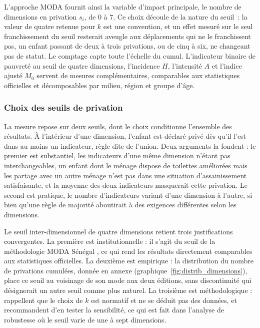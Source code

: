 L'approche MODA fournit ainsi la variable d'impact principale, le nombre
de dimensions en privation $s_i$, de 0 à 7. Ce choix découle de la nature
du seuil~: la valeur de quatre retenue pour $k$ est une convention, et un effet mesuré sur le seul
franchissement du seuil resterait aveugle aux déplacements qui ne le
franchissent pas, un enfant passant de deux à trois privations, ou de cinq
à six, ne changeant pas de statut. Le comptage capte toute l'échelle du
cumul. L'indicateur binaire de pauvreté au seuil de quatre dimensions, l'incidence $H$,
l'intensité $A$ et l'indice ajusté $M_0$ servent de mesures
complémentaires, comparables aux statistiques officielles et décomposables
par milieu, région et groupe d'âge.

\subsubsection{Choix des seuils de privation}

La mesure repose sur deux seuils, dont le choix conditionne l'ensemble des
résultats. À l'intérieur d'une dimension, l'enfant est déclaré privé dès
qu'il l'est dans au moins un indicateur, règle dite de l'union. Deux
arguments la fondent : le premier est substantiel, les indicateurs d'une
même dimension n'étant pas interchangeables, un enfant dont le ménage
dispose de toilettes améliorées mais les partage avec un autre ménage n'est
pas dans une situation d'assainissement satisfaisante, et la moyenne des
deux indicateurs masquerait cette privation. Le second est pratique, le
nombre d'indicateurs variant d'une dimension à l'autre, si bien qu'une
règle de majorité aboutirait à des exigences différentes selon les
dimensions.

Le seuil inter-dimensionnel de quatre dimensions retient trois justifications
convergentes. La première est institutionnelle : il s'agit du seuil de la
méthodologie MODA Sénégal \parencite{ansd2024}, ce qui rend les résultats
directement comparables aux statistiques officielles. La deuxième est
empirique : la distribution du nombre de privations cumulées, donnée en
annexe (graphique~\ref{fig:distrib_dimensions}), place ce seuil au voisinage de
son mode aux deux éditions, sans discontinuité qui désignerait un autre
seuil comme plus naturel. La troisième est méthodologique :
\textcite{alkire2011} rappellent que le choix de $k$ est normatif et ne se
déduit pas des données, et recommandent d'en tester la sensibilité, ce qui
est fait dans l'analyse de robustesse où le seuil varie de une à sept
dimensions.

